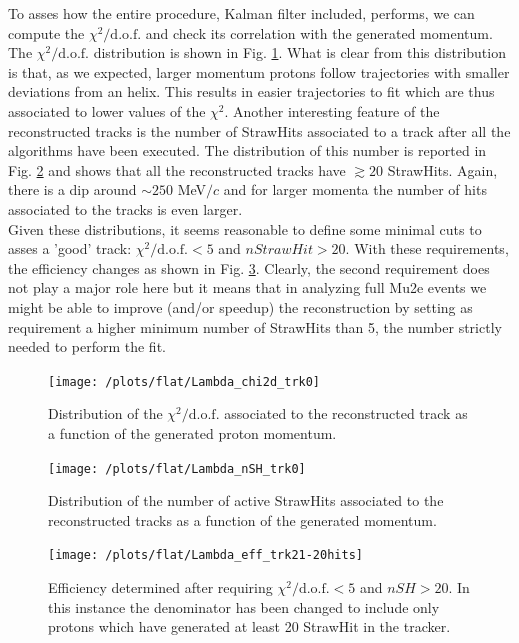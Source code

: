 \documentclass[12pt,a4paper,openright, oneside, titlepage]{book} %
\begin{document}
\noindent
To asses how the entire procedure, Kalman filter included, performs, 
we can compute the $\chi^2/\textrm{d.o.f.}$ and check its correlation with the generated momentum. 
The  $\chi^2/\textrm{d.o.f.}$ distribution is shown in Fig. \ref{_Lambda_chi2d_trk0}. 
What is clear from this distribution is that, as we expected, 
larger momentum protons follow trajectories with smaller deviations from an helix. 
This results in easier trajectories to fit which are thus associated to lower values of the $\chi^2$. 
Another interesting feature of the reconstructed tracks is the number of StrawHits associated to a track after all the algorithms have been executed. 
The distribution of this number is reported in Fig. \ref{_Lambda_nSH_trk0} 
and shows that all the reconstructed tracks have $\gtrsim 20$ StrawHits. 
Again, there is a dip  around $\sim 250$ MeV$/c$ and for larger momenta the number of hits associated to the tracks is even larger.\\
Given these distributions, it seems reasonable to define some minimal cuts to asses a 'good' track: $\chi^2/\textrm{d.o.f.}<5$ and $nStrawHit>20$.
With these requirements, the efficiency changes as shown in Fig.  \ref{_Lambda_eff_trk21-20hits}.
Clearly, the second requirement does not play a major role here but it means that in analyzing full Mu2e events we might be able to improve (and/or speedup) the reconstruction by setting as requirement a higher minimum number of StrawHits than 5, the number strictly needed to perform the fit.

\begin{figure}[!htb]
\centering
\texttt{[image: /plots/flat/Lambda\_chi2d\_trk0]}
\caption[$\chi^2/\textrm{d.o.f.}$ associated to the tracks]
{Distribution of the $\chi^2/\textrm{d.o.f.}$ associated to the reconstructed track 
as a function of the generated proton momentum.}
\label{_Lambda_chi2d_trk0}
\end{figure}

\begin{figure}[!htb]
\centering
\texttt{[image: /plots/flat/Lambda\_nSH\_trk0]}
\caption[Number of StrawHits associated to a track per generated momentum]{Distribution of the number of active StrawHits associated to the reconstructed tracks 
as a function of the generated momentum.}
\label{_Lambda_nSH_trk0}
\end{figure}

\begin{figure}[!htb]
\centering
\texttt{[image: /plots/flat/Lambda\_eff\_trk21-20hits]}
\caption[Efficiency of the algorithm after requirements]{Efficiency determined after requiring $\chi^2/\textrm{d.o.f.}<5$ and $nSH>20$. 
In this instance the denominator has been changed to include only protons 
which have generated at least 20 StrawHit in the tracker.}
\label{_Lambda_eff_trk21-20hits}
\end{figure}
\end{document}
